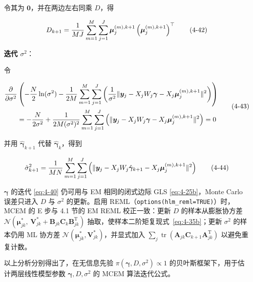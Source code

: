 \documentclass[12pt,a4paper]{ctexart}
\makeatletter
\numberwithin{figure}{section}
\numberwithin{table}{section}
\let\ltx@orig@tag\tag
\renewcommand{\tag}[1]{\refstepcounter{equation}\ltx@orig@tag{#1}}%
\makeatother
\begin{document}
令其为 $\mathbf{0}$，并在两边左右同乘 $D$，得

\begin{equation}
D_{k+1}=\frac{1}{MJ}\sum_{m=1}^{M}\sum_{j=1}^{J}
\boldsymbol{\mu}_j^{(m),k+1}\left(\boldsymbol{\mu}_j^{(m),k+1}\right)^{\top}
\tag{4-42}\label{eq:4-42}
\end{equation}

\textbf{迭代 $\sigma^2$}：

令

\begin{equation}
\begin{aligned}
\frac{\partial}{\partial \sigma^2}
&\left(-\frac{N}{2}\ln(\sigma^2)-\frac{1}{2M}\sum_{m=1}^{M}\sum_{j=1}^{J}
\left(\frac{1}{\sigma^2}\lVert \boldsymbol{y}_j-X_jW_j\boldsymbol{\gamma}-X_j\boldsymbol{\mu}_j^{(m),k+1}\rVert^2\right)\right)\\
&=-\frac{N}{2\sigma^2}+\frac{1}{2M(\sigma^2)^2}\sum_{m=1}^{M}\sum_{j=1}^{J}
\left(\lVert \boldsymbol{y}_j-X_jW_j\boldsymbol{\gamma}-X_j\boldsymbol{\mu}_j^{(m),k+1}\rVert^2\right)=0
\end{aligned}
\tag{4-43}
\end{equation}

并用 $\hat{\boldsymbol{\gamma}}_{k+1}$ 代替 $\hat{\boldsymbol{\gamma}}_k$，得到

\begin{equation}
\hat{\sigma}_{k+1}^2=\frac{1}{MN}\sum_{m=1}^{M}\sum_{j=1}^{J}
\left(\lVert \boldsymbol{y}_j-X_jW_j\hat{\boldsymbol{\gamma}}_{k+1}-X_j\boldsymbol{\mu}_j^{(m),k+1}\rVert^2\right)
\tag{4-44}\label{eq:4-44}
\end{equation}

$\boldsymbol{\gamma}$ 的迭代 \eqref{eq:4-40} 仍可用与 EM 相同的闭式边际 GLS \eqref{eq:4-25b}，Monte Carlo 误差只进入 $D$ 与 $\sigma^2$ 的更新。启用 REML（\texttt{options(hlm\_reml=TRUE)}）时，MCEM 的 E 步与 4.1 节的 EM REML 校正一致：更新 $D$ 的样本从膨胀协方差 $\mathcal{N}\!\left(\boldsymbol{\mu}_{jk}^{*},\ \mathbf{V}_{jk}^{*}+\mathbf{B}_{jk}\mathbf{C}_{k}\mathbf{B}_{jk}^{\mathrm{T}}\right)$ 抽取，使样本二阶矩复现式~\eqref{eq:4-35b}；更新 $\sigma^2$ 的样本仍用 ML 协方差 $\mathcal{N}(\boldsymbol{\mu}_{jk}^{*},\mathbf{V}_{jk}^{*})$，并显式加入 $\sum_{j}\operatorname{tr}\!\left(\mathbf{A}_{jk}\mathbf{C}_{k+1}\mathbf{A}_{jk}^{\mathrm{T}}\right)$ 以避免重复计数。

以上分析分别得出了，在无信息先验 $\pi(\boldsymbol{\gamma},D,\sigma^2)\propto 1$ 的贝叶斯框架下，用于估计两层线性模型参数 $\boldsymbol{\gamma},D,\sigma^2$ 的 MCEM 算法迭代公式。
\end{document}
